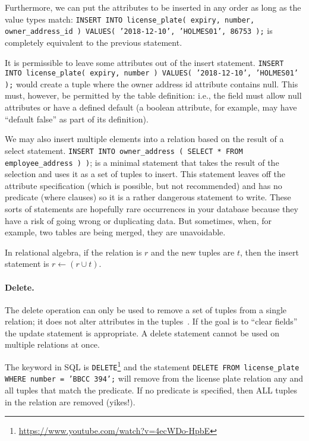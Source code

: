 \documentclass[a4paper]{report}
\begin{document}
Furthermore, we can put the attributes to be inserted in any order as long as the value types match: \texttt{INSERT INTO license\_plate( expiry, number, owner\_address\_id ) VALUES( '2018-12-10', 'HOLMES01', 86753 );}  is completely equivalent to the previous statement.

It is permissible to leave some attributes out of the insert statement. \texttt{INSERT INTO license\_plate( expiry, number ) VALUES( '2018-12-10', 'HOLMES01' );} would create a tuple where the owner address id attribute contains null. This must, however, be permitted by the table definition: i.e., the field must allow null attributes or have a defined default (a boolean attribute, for example, may have ``default false'' as part of its definition).

We may also insert multiple elements into a relation based on the result of a select statement. \texttt{INSERT INTO owner\_address ( SELECT * FROM employee\_address ) )}; is a minimal statement that takes the result of the selection and uses it as a set of tuples to insert. This statement leaves off the attribute specification (which is possible, but not recommended) and has no predicate (where clauses) so it is a rather dangerous statement to write. These sorts of statements are hopefully rare occurrences in your database because they have a risk of going wrong or duplicating data. But sometimes, when, for example, two tables are being merged, they are unavoidable.

In relational algebra, if the relation is $r$ and the new tuples are $t$, then the insert statement is $r \leftarrow (r \cup t)$.

\paragraph{Delete.}

The delete operation can only be used to remove a set of tuples from a single relation; it does not alter attributes in the tuples~\cite{dsc}. If the goal is to ``clear fields'' the update statement is appropriate. A delete statement cannot be used on multiple relations at once.

The keyword in SQL is \texttt{DELETE}\footnote{\url{https://www.youtube.com/watch?v=4ecWDo-HpbE}} and the statement \texttt{DELETE FROM license\_plate WHERE number = 'BBCC 394';} will remove from the license plate relation any and all tuples that match the predicate. If no predicate is specified, then ALL tuples in the relation are removed (yikes!).
\end{document}
